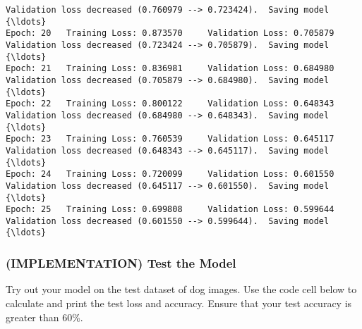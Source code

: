 \documentclass[11pt]{article}
\begin{document}
\begin{Verbatim}[commandchars=\\\{\}]
Validation loss decreased (0.760979 --> 0.723424).  Saving model {\ldots}
Epoch: 20 	Training Loss: 0.873570 	Validation Loss: 0.705879
Validation loss decreased (0.723424 --> 0.705879).  Saving model {\ldots}
Epoch: 21 	Training Loss: 0.836981 	Validation Loss: 0.684980
Validation loss decreased (0.705879 --> 0.684980).  Saving model {\ldots}
Epoch: 22 	Training Loss: 0.800122 	Validation Loss: 0.648343
Validation loss decreased (0.684980 --> 0.648343).  Saving model {\ldots}
Epoch: 23 	Training Loss: 0.760539 	Validation Loss: 0.645117
Validation loss decreased (0.648343 --> 0.645117).  Saving model {\ldots}
Epoch: 24 	Training Loss: 0.720099 	Validation Loss: 0.601550
Validation loss decreased (0.645117 --> 0.601550).  Saving model {\ldots}
Epoch: 25 	Training Loss: 0.699808 	Validation Loss: 0.599644
Validation loss decreased (0.601550 --> 0.599644).  Saving model {\ldots}

    \end{Verbatim}

    \hypertarget{implementation-test-the-model}{%
\subsubsection{(IMPLEMENTATION) Test the
Model}\label{implementation-test-the-model}}

Try out your model on the test dataset of dog images. Use the code cell
below to calculate and print the test loss and accuracy. Ensure that
your test accuracy is greater than 60\%.
\end{document}
